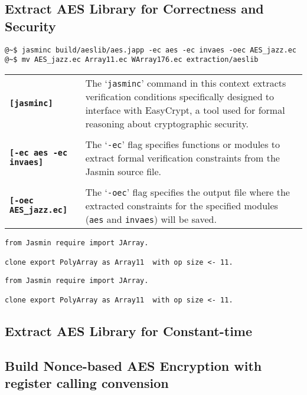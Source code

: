 \subsection{Extract AES Library for Correctness and Security}
\begin{lstlisting}[style=normal]
@~$ jasminc build/aeslib/aes.japp -ec aes -ec invaes -oec AES_jazz.ec
@~$ mv AES_jazz.ec Array11.ec WArray176.ec extraction/aeslib
\end{lstlisting}
\begin{table}[h!]
\begin{tabularx}{\textwidth}{>{\raggedleft\arraybackslash}p{}p{}}
	\textbf{\texttt{[jasminc]}}  & The `\texttt{jasminc}' command in this context extracts verification conditions specifically designed to interface with EasyCrypt, a tool used for formal reasoning about cryptographic security. \\ \\
	\textbf{\texttt{[-ec aes -ec invaes]}} & The `\texttt{-ec}' flag specifies functions or modules to extract formal verification constraints from the Jasmin source file.
	\\ \\
	\textbf{\texttt{[-oec AES\_jazz.ec]}} & The `\texttt{-oec}' flag specifies the output file where the extracted constraints for the specified modules (\texttt{aes} and \texttt{invaes}) will be saved.
\end{tabularx}
\end{table}
\begin{lstlisting}[style=easycrypt, caption={Array11.ec}, captionpos=t]
from Jasmin require import JArray.

clone export PolyArray as Array11  with op size <- 11.
\end{lstlisting}
\begin{lstlisting}[style=easycrypt, caption={WArray176.ec}, captionpos=t]
from Jasmin require import JArray.

clone export PolyArray as Array11  with op size <- 11.
\end{lstlisting}


\subsection{Extract AES Library for Constant-time}
\subsection{Build Nonce-based AES Encryption with register calling convension}

